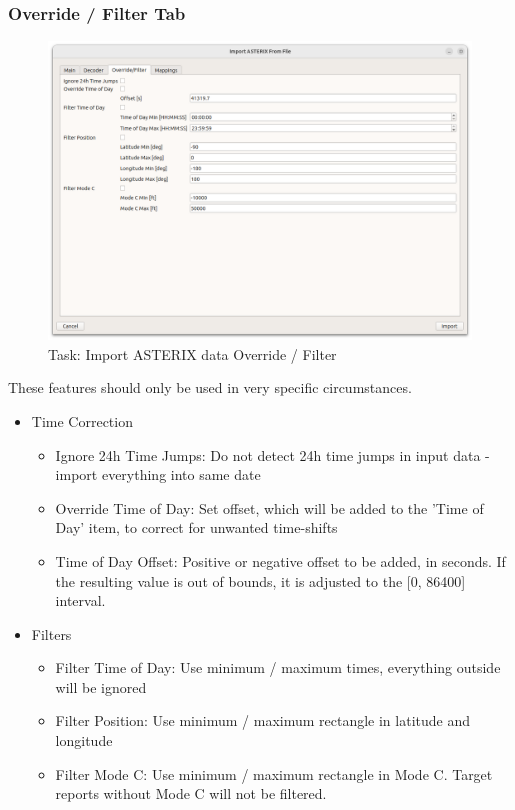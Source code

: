 \subsubsection{Override / Filter Tab}
\label{sec:task_import_asterix_override}

\begin{figure}[H]
  \center
    \hspace*{-0.5cm}
    \includegraphics[width=17cm]{figures/asterix_import_data_override.png}
  \caption{Task: Import ASTERIX data Override / Filter}
\end{figure}

These features should only be used in very specific circumstances.

\begin{itemize}
\item Time Correction
\begin{itemize}
\item Ignore 24h Time Jumps: Do not detect 24h time jumps in input data - import everything into same date
\item Override Time of Day: Set offset, which will be added to the 'Time of Day'  item, to correct for unwanted time-shifts
\item Time of Day Offset: Positive or negative offset to be added, in seconds. If the resulting value is out of bounds, it is adjusted to the [0, 86400] interval.
\end{itemize}
\item Filters
\begin{itemize}
\item Filter Time of Day: Use minimum / maximum times, everything outside will be ignored
\item Filter Position: Use minimum / maximum rectangle in latitude and longitude
\item Filter Mode C: Use minimum / maximum rectangle in Mode C. Target reports without Mode C will not be filtered.
\end{itemize}
\end{itemize}
\ \\

